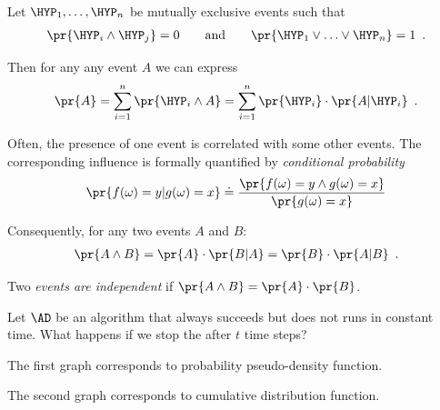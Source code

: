 \documentclass[landscape,footrule]{foils}
\begin{document}

Let $\HYP_1,\ldots,\HYP_n$ be mutually exclusive events such that
\begin{align*}
  \pr{\HYP_i\wedge\HYP_j}=0\qquad\text{and}\qquad
  \pr{\HYP_1\vee\ldots\vee\HYP_n}=1\enspace.
\end{align*}

Then for any any event $A$ we can express
\begin{align*}
  \pr{A}=\sum_{i=1}^n \pr{\HYP_i\wedge A}=\sum_{i=1}^n \pr{\HYP_i}\cdot\pr{A|\HYP_i}\enspace.
\end{align*}\vspace*{-4ex} 



Often, the presence of one event is correlated with some other
events. The corresponding influence is formally quantified by
\emph{conditional probability}
\begin{align*}
  \pr{f(\omega)=y|g(\omega)=x}\doteq\frac{\pr{f(\omega)=y\wedge
      g(\omega)=x}}{\pr{ g(\omega)=x}}
\end{align*}
\bigskip

Consequently,  for any two events $A$ and $B$:
\begin{align*}
  \pr{A\wedge B}=\pr{A}\cdot\pr{B|A}=\pr{B}\cdot\pr{A|B}\enspace.
\end{align*}

Two \emph{events are independent} if $\pr{A\wedge B}=\pr{A}\cdot\pr{B}$.



Let $\AD$ be an algorithm that always succeeds but does not runs in constant
time. What happens if we stop the after $t$ time steps?


\begin{triangles}
  \item The first graph corresponds to probability pseudo-density function.
  \item The second graph corresponds to cumulative distribution function.
\end{triangles}
\end{document}
